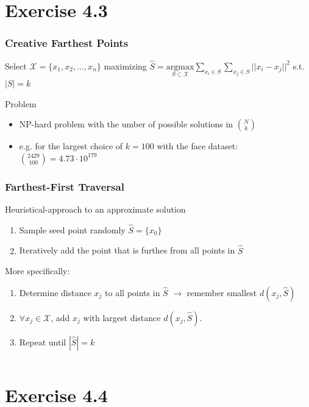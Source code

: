 \documentclass[10pt,aspectratio=169,handout]{beamer}
\begin{document}
\section{Exercise 4.3}

\begin{frame}
    \frametitle{Creative Farthest Points}

    Select $\mathcal{X} = \{x_1, x_2, \dots, x_n \}$ maximizing $\hat{S} = \underset{S \subset \mathcal{X}}{\mathrm{argmax}}  \underset{x_i \in S}\sum \underset{x_j \in S}\sum || x_i - x_j||^2$ s.t. $|S| = k$

    Problem
    \begin{itemize}
        \item NP-hard problem with the umber of possible solutions in ${N\choose k}$
        \item e.g. for the largest choice of $k=100$ with the face dataset: ${2429\choose 100} = 4.73 \cdot 10^{179}$ 
    \end{itemize}
\end{frame}

\begin{frame}
    \frametitle{Farthest-First Traversal}
    Heuristical-approach to an approximate solution
    \begin{enumerate}
        \item Sample seed point randomly $\hat{S} = \{ x_0 \}$
        \item Iteratively add the point that is furthes from all points in $\hat{S}$
    \end{enumerate}

    More specifically: 
    \begin{enumerate}
        \item Determine distance $x_j$ to all points in $\hat{S}$ $\rightarrow$ remember smallest $d(x_j, \hat{S})$
        \item $\forall x_j  \in \mathcal{X}$, add $x_j$ with largest distance $d(x_j, \hat{S})$.
        \item Repeat until $|\hat{S}| = k$
    \end{enumerate}
\end{frame}

\begin{frame}
    \inputminted[bgcolor=LightGray,fontsize=\small]{python}{code/farthest-first.py}
\end{frame}


\section{Exercise 4.4}
\end{document}
